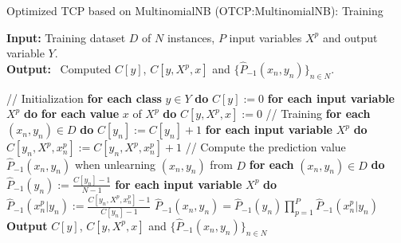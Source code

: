 \documentclass[10pt]{reportMaster}
\begin{document}
\begin{algorithm}[H]
\caption{Optimized TCP based on MultinomialNB (OTCP:MultinomialNB): Training}\label{alg:OTCPM-Training}
\textbf{Input:} \; \; Training dataset $D$ of $N$ instances, $P$ input variables $X^p$ and output variable $Y$.\\
\textbf{Output:} \, Computed $C[y]$, $C[y, X^p,x]$ and $\{\hat{P}_{-1}(x_n,y_n)\}_{n \in N}$.

\begin{algorithmic}[1]
\State // Initialization
\State \textbf{for each class} $y \in Y$ \textbf{do}
\State \qquad $C[y] := 0$
\State \qquad \textbf{for each input variable} $X^p$ \textbf{do}
\State \qquad \qquad \textbf{for each value} $x$ of $X^p$ \textbf{do}
\State \qquad \qquad \qquad $C[y,X^p,x] := 0$
\State // Training
\State \textbf{for each} $(x_n,y_n) \in D$ \textbf{do}
\State \qquad $C[y_n] := C[y_n]+1$
\State \qquad \textbf{for each input variable} $X^p$ \textbf{do}
\State \qquad \qquad $C[y_n,X^p,x_n^p]:=C[y_n,X^p,x_n^p]+1$
\State // Compute the prediction value $\hat{P}_{-1}(x_n,y_n)$ when unlearning $(x_n,y_n)$ from $D$
\State \textbf{for each} $(x_n,y_n) \in D$ \textbf{do}
\State \qquad $\hat{P}_{-1}(y_n) := \frac{C[y_n]-1}{N-1}$
\State \qquad \textbf{for each input variable} $X^p$ \textbf{do}
\State \qquad \qquad $\hat{P}_{-1}(x_n^p|y_n):=\frac{C[y_n,X^p,x_n^p]-1}{C[y_n]-1}$
\State \qquad $\hat{P}_{-1}(x_n,y_n)=\hat{P}_{-1}(y_n) \prod_{p=1}^P \hat{P}_{-1}(x_n^p|y_n)$
\State \textbf{Output} $C[y]$, $C[y, X^p,x]$ and $\{\hat{P}_{-1}(x_n,y_n)\}_{n \in N}$
\end{algorithmic}
\end{algorithm}
\end{document}
